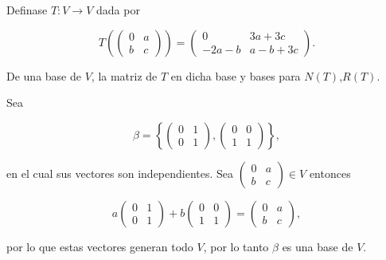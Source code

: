 \documentclass[letterpaper]{article}
\theoremstyle{definition}
\theoremstyle{lemathm}
\theoremstyle{lemademthm}
\begin{document}
\begin{enumerate}
		Definase $T: V \rightarrow V$ dada por

		\[T\left(\begin{pmatrix}
			0 & a\\
			b & c
		\end{pmatrix}\right) = \begin{pmatrix}
			0 & 3a + 3c\\
			-2a-b & a-b+3c
		\end{pmatrix}.\]

		De una base de $V$, la matriz de $T$ en dicha base y bases para $N(T)$,$R(T)$.

		Sea

		\[\beta = \left\{\begin{pmatrix}
			0 & 1\\
			0 & 1
		\end{pmatrix}, \begin{pmatrix}
			0 & 0\\
			1 & 1
		\end{pmatrix}\right\},\]

		en el cual sus vectores son independientes. Sea $\begin{pmatrix}
			0 & a\\
			b & c
		\end{pmatrix} \in V$ entonces

		\[a\begin{pmatrix}
			0 & 1\\
			0 & 1
		\end{pmatrix} + b\begin{pmatrix}
			0 & 0\\
			1 & 1
		\end{pmatrix} = \begin{pmatrix}
			0 & a\\
			b & c
		\end{pmatrix},\]

		por lo que estas vectores generan todo $V$, por lo tanto $\beta$ es una base de $V$.


\end{enumerate}
\end{document}
